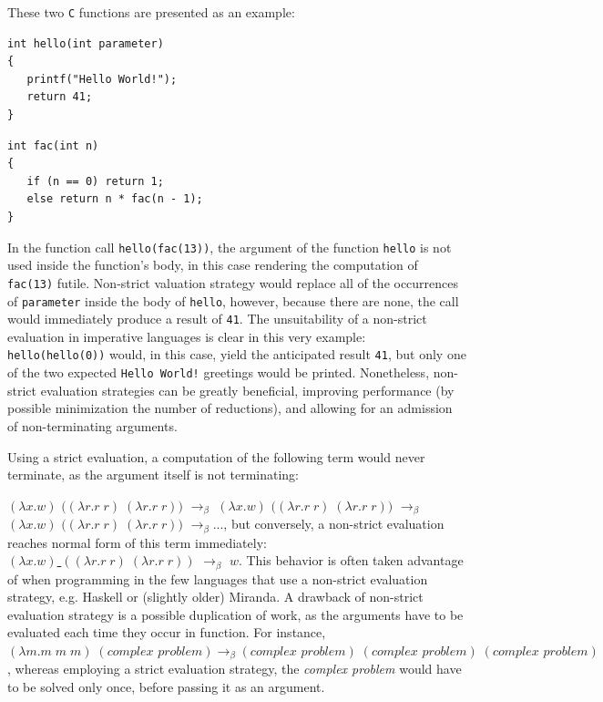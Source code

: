 \documentclass[table, a4paper, 10pt]{article}
\begin{document}
\vspace{0.1cm}
\noindent
These two \texttt{C} functions are presented as an example:
\vspace{-0.3cm}
\begin{multicols}{2}
\begin{lstlisting}
int hello(int parameter)
{
   printf("Hello World!");
   return 41;
}
\end{lstlisting}
\columnbreak
\begin{lstlisting}
int fac(int n)
{
   if (n == 0) return 1;
   else return n * fac(n - 1);
}
\end{lstlisting}
\end{multicols}
\vspace{-0.5cm}
\noindent
In the function call \texttt{hello(fac(13))}, the argument of the
function \texttt{hello} is not used inside the function's body,
in this case rendering the computation of \texttt{fac(13)} futile.
Non-strict valuation strategy would replace all of the occurrences of
\texttt{parameter} inside the body of \texttt{hello}, however, because there are none,
the call would immediately produce a result of \texttt{41}. The unsuitability of
a non-strict evaluation in imperative languages is clear in this very example:
\texttt{hello(hello(0))} would, in this case, yield the anticipated result \texttt{41}, but only one
of the two expected
\texttt{Hello World!} greetings would be printed. Nonetheless, non-strict
evaluation strategies can be greatly beneficial, improving performance (by possible minimization the number of reductions),
and allowing for an admission of non-terminating arguments.

Using a strict evaluation, a computation of the following term would never terminate,
as the argument itself is not terminating:

\noindent
{\small
$(\lambda x.w)$ $($\underline{$(\lambda r. r\;r)\;(\lambda r.r\;r)$}$)$ $\to_\beta$
$(\lambda x.w)$ $($\underline{$(\lambda r. r\;r)\;(\lambda r.r\;r)$}$)$ $\to_\beta$
$(\lambda x.w)$ $($\underline{$(\lambda r. r\;r)\;(\lambda r.r\;r)$}$)$ $\to_\beta ...$},
but conversely, a non-strict evaluation reaches normal form of this term immediately:\\
{\small\underline{$(\lambda x.w)$ $((\lambda r. r\;r)\;(\lambda r.r\;r))$} $\to_\beta$ $w$}.
This behavior is often taken advantage of when programming in the few languages that use a non-strict
evaluation strategy, e.g. Haskell or (slightly older) Miranda.
A drawback of non-strict evaluation strategy is a possible duplication
of work, as the arguments have to be evaluated each time they occur in function.
For instance,
{\small$(\lambda m.m\;m\;m)\;(\textit{complex problem}) \to_\beta (\textit{complex problem})\;(\textit{complex problem})\;(\textit{complex problem})$},
whereas employing a strict evaluation strategy, the \textit{complex problem} would have to be solved only once,
before passing it as an argument.
\end{document}
